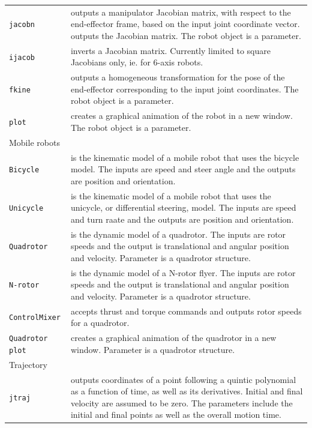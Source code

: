 \documentclass[a4paper,twoside]{report}
\begin{document}
\begin{longtable}{p{}p{}}
\texttt{jacobn} & outputs a manipulator Jacobian matrix, with respect
to the end-effector frame,  based on the
input joint coordinate vector.
outputs the Jacobian matrix.  
The robot object is a parameter.\\

\texttt{ijacob} & inverts a Jacobian matrix.  Currently limited
to square Jacobians only, ie. for 6-axis robots.\\

\texttt{fkine} & outputs a homogeneous transformation for the 
pose of the end-effector corresponding to the input joint coordinates.
The robot object is a parameter.\\

\texttt{plot} &  creates a graphical animation of the robot in a new window. The robot object is a parameter.\\

\cmidrule{1-1}
Mobile robots \\

\texttt{Bicycle} & is the kinematic model of a mobile robot that uses the bicycle model. The inputs are speed and steer angle and the outputs are position and orientation. \\
\texttt{Unicycle} & is the kinematic model of a mobile robot that uses the unicycle, or differential steering, model. The inputs are speed and turn raate and the outputs are position and orientation.\\ 

\texttt{Quadrotor} & 
is the dynamic model of a quadrotor. The inputs are rotor speeds and the output is translational and angular position and velocity. Parameter is a quadrotor structure.\\

\texttt{N-rotor} & 
is the dynamic model of a N-rotor flyer. The inputs are rotor speeds and the output is translational and angular position and velocity. Parameter is a quadrotor structure.\\

\texttt{ControlMixer} & accepts thrust and torque commands and outputs rotor speeds for a quadrotor.\\

\texttt{Quadrotor plot} & creates a graphical animation of the quadrotor in a new window.
Parameter is a quadrotor structure.\\

\cmidrule{1-1}
Trajectory \\

\texttt{jtraj} & outputs coordinates of a point following a quintic polynomial as a function of time, as well as its derivatives. Initial and final velocity are assumed to be zero. The parameters include the initial and final points as well as the overall motion time.\\


\end{longtable}
\end{document}
